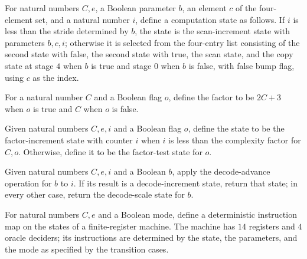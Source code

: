 \begin{definition}
\label{Complexity.compAdvance}
\leanok
{}
For natural numbers $C,e$, a Boolean parameter $b$, an element $c$ of the four-element
set, and a natural number $i$, define a computation state as follows. If $i$ is less
than the stride determined by $b$, the state is the scan-increment state with parameters
$b,c,i$; otherwise it is selected from the four-entry list consisting of the second
state with false, the second state with true, the scan state, and the copy state at
stage $4$ when $b$ is true and stage $0$ when $b$ is false, with false bump flag, using
$c$ as the index.
\end{definition}

\begin{definition}
\label{Complexity.compFactor}
\leanok
For a natural number $C$ and a Boolean flag $o$, define the factor to be $2C+3$ when $o$
is true and $C$ when $o$ is false.
\end{definition}

\begin{definition}
\label{Complexity.compFactorAdvance}
\leanok
{}
Given natural numbers $C,e,i$ and a Boolean flag $o$, define the state to be the
factor-increment state with counter $i$ when $i$ is less than the complexity factor for
$C,o$. Otherwise, define it to be the factor-test state for $o$.
\end{definition}

\begin{definition}
\label{Complexity.compDecodeAdvance}
\leanok
{}
Given natural numbers $C,e,i$ and a Boolean $b$, apply the decode-advance operation for
$b$ to $i$. If its result is a decode-increment state, return that state; in every other
case, return the decode-scale state for $b$.
\end{definition}

\begin{definition}
\label{Complexity.compARM}
\leanok
{}
For natural numbers $C,e$ and a Boolean mode, define a deterministic instruction map on
the states of a finite-register machine. The machine has $14$ registers and $4$ oracle
deciders; its instructions are determined by the state, the parameters, and the mode as
specified by the transition cases.
\end{definition}

